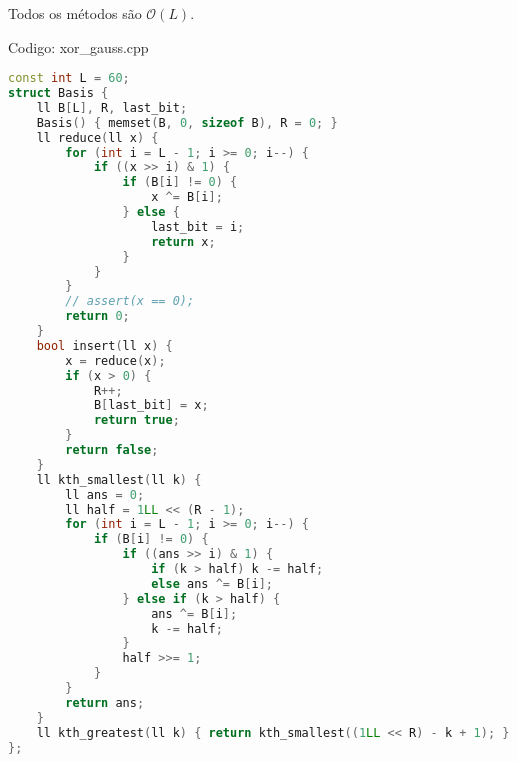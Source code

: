 \documentclass[10pt, a4paper, oneside]{book}
\begin{document}
Todos os métodos são $\mathcal{O}(L)$.
\hfill

Codigo: xor\_gauss.cpp

\begin{lstlisting}[language=C++]
const int L = 60;
struct Basis {
    ll B[L], R, last_bit;
    Basis() { memset(B, 0, sizeof B), R = 0; }
    ll reduce(ll x) {
        for (int i = L - 1; i >= 0; i--) {
            if ((x >> i) & 1) {
                if (B[i] != 0) {
                    x ^= B[i];
                } else {
                    last_bit = i;
                    return x;
                }
            }
        }
        // assert(x == 0);
        return 0;
    }
    bool insert(ll x) {
        x = reduce(x);
        if (x > 0) {
            R++;
            B[last_bit] = x;
            return true;
        }
        return false;
    }
    ll kth_smallest(ll k) {
        ll ans = 0;
        ll half = 1LL << (R - 1);
        for (int i = L - 1; i >= 0; i--) {
            if (B[i] != 0) {
                if ((ans >> i) & 1) {
                    if (k > half) k -= half;
                    else ans ^= B[i];
                } else if (k > half) {
                    ans ^= B[i];
                    k -= half;
                }
                half >>= 1;
            }
        }
        return ans;
    }
    ll kth_greatest(ll k) { return kth_smallest((1LL << R) - k + 1); }
};
\end{lstlisting}
\hfill
\end{document}
